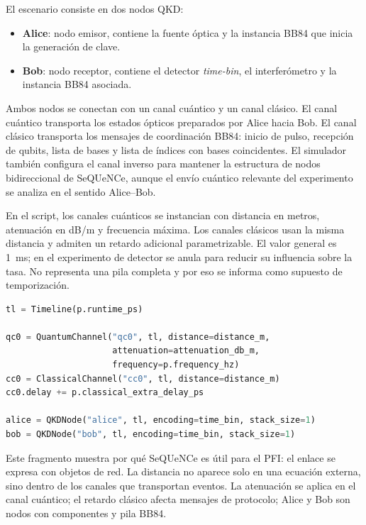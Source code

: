 El escenario consiste en dos nodos QKD:

\begin{itemize}
  \item \textbf{Alice}: nodo emisor, contiene la fuente óptica y la instancia BB84 que inicia la generación de clave.
  \item \textbf{Bob}: nodo receptor, contiene el detector \textit{time-bin}, el interferómetro y la instancia BB84 asociada.
\end{itemize}

Ambos nodos se conectan con un canal cuántico y un canal clásico. El canal cuántico transporta los estados ópticos preparados por Alice hacia Bob. El canal clásico transporta los mensajes de coordinación BB84: inicio de pulso, recepción de qubits, lista de bases y lista de índices con bases coincidentes. El simulador también configura el canal inverso para mantener la estructura de nodos bidireccional de SeQUeNCe, aunque el envío cuántico relevante del experimento se analiza en el sentido Alice--Bob.

En el script, los canales cuánticos se instancian con distancia en metros, atenuación en dB/m y frecuencia máxima. Los canales clásicos usan la misma distancia y admiten un retardo adicional parametrizable. El valor general es \SI{1}{\milli\second}; en el experimento de detector se anula para reducir su influencia sobre la tasa. No representa una pila completa y por eso se informa como supuesto de temporización.

\begin{lstlisting}[language=Python, caption={Creación de línea temporal, canales y nodos Alice--Bob.}, label={lst:canales_nodos_cap6}]
tl = Timeline(p.runtime_ps)

qc0 = QuantumChannel("qc0", tl, distance=distance_m,
                     attenuation=attenuation_db_m,
                     frequency=p.frequency_hz)
cc0 = ClassicalChannel("cc0", tl, distance=distance_m)
cc0.delay += p.classical_extra_delay_ps

alice = QKDNode("alice", tl, encoding=time_bin, stack_size=1)
bob = QKDNode("bob", tl, encoding=time_bin, stack_size=1)
\end{lstlisting}

Este fragmento muestra por qué SeQUeNCe es útil para el PFI: el enlace se expresa con objetos de red. La distancia no aparece solo en una ecuación externa, sino dentro de los canales que transportan eventos. La atenuación se aplica en el canal cuántico; el retardo clásico afecta mensajes de protocolo; Alice y Bob son nodos con componentes y pila BB84.

